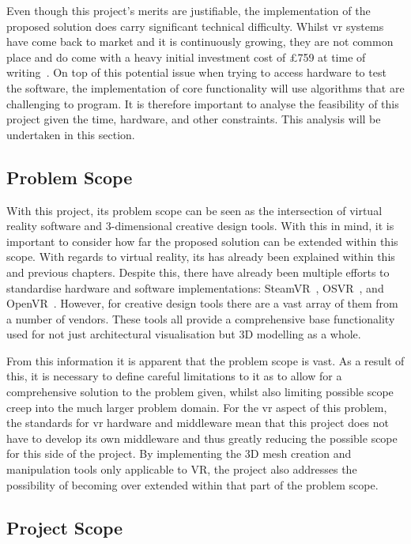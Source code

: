     Even though this project's merits are justifiable, the implementation of the proposed solution does carry significant technical difficulty. Whilst \acrshort{vr} systems have come back to market and it is continuously growing, they are not common place and do come with a heavy initial investment cost of £759 at time of writing~\cite{viveCost}. On top of this potential issue when trying to access hardware to test the software, the implementation of core functionality will use algorithms that are challenging to program. It is therefore important to analyse the feasibility of this project given the time, hardware, and other constraints. This analysis will be undertaken in this section.
    
    \subsection{Problem Scope}
    
        With this project, its problem scope can be seen as the intersection of virtual reality software and 3-dimensional creative design tools. With this in mind, it is important to consider how far the proposed solution can be extended within this scope. With regards to virtual reality, its has already been explained within this and previous chapters. Despite this, there have already been multiple efforts to standardise hardware and software implementations: SteamVR~\cite{steamVRFAQ}, OSVR~\cite{osvrAbout}, and OpenVR~\cite{openVRAnnouncement}. However, for creative design tools there are a vast array of them from a number of vendors. These tools all provide a comprehensive base functionality used for not just architectural visualisation but 3D modelling as a whole.
        
        From this information it is apparent that the problem scope is vast. As a result of this, it is necessary to define careful limitations to it as to allow for a comprehensive solution to the problem given, whilst also limiting possible scope creep into the much larger problem domain. For the \acrshort{vr} aspect of this problem, the standards for \acrshort{vr} hardware and middleware mean that this project does not have to develop its own middleware and thus greatly reducing the possible scope for this side of the project. By implementing the 3D mesh creation and manipulation tools only applicable to VR, the project also addresses the possibility of becoming over extended within that part of the problem scope.
    
    \subsection{Project Scope}
    
